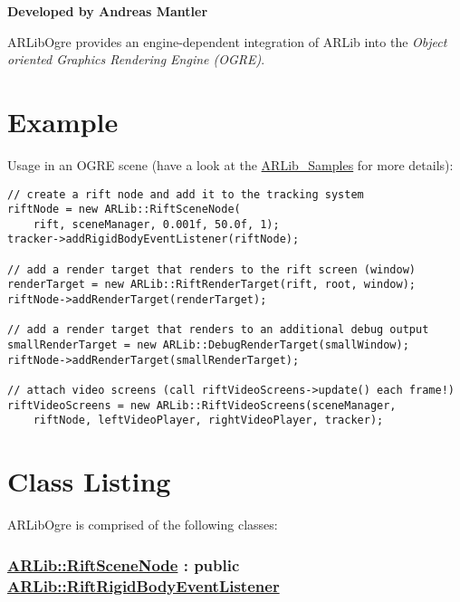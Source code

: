 \begin{center}
\textbf{Developed by Andreas Mantler}
\end{center}
ARLibOgre provides an engine-dependent integration of ARLib into the \emph{Object oriented Graphics Rendering Engine (OGRE)}\cite{ogre}.

\section{Example}\label{example}

Usage in an OGRE scene (have a look at the
\href{https://github.com/ands/OculusMeetsAR/tree/master/ARLib_Samples}{ARLib\_Samples}
for more details):

\begin{lstlisting}
// create a rift node and add it to the tracking system
riftNode = new ARLib::RiftSceneNode(
    rift, sceneManager, 0.001f, 50.0f, 1);
tracker->addRigidBodyEventListener(riftNode);

// add a render target that renders to the rift screen (window)
renderTarget = new ARLib::RiftRenderTarget(rift, root, window);
riftNode->addRenderTarget(renderTarget);

// add a render target that renders to an additional debug output
smallRenderTarget = new ARLib::DebugRenderTarget(smallWindow);
riftNode->addRenderTarget(smallRenderTarget);

// attach video screens (call riftVideoScreens->update() each frame!)
riftVideoScreens = new ARLib::RiftVideoScreens(sceneManager,
    riftNode, leftVideoPlayer, rightVideoPlayer, tracker);
\end{lstlisting}

\section{Class Listing}
ARLibOgre is comprised of the following classes:

\newpage
\subsubsection{\texorpdfstring{\href{https://github.com/ands/OculusMeetsAR/blob/master/ARLib/include/ARLib/Ogre/RiftSceneNode.h}{ARLib::RiftSceneNode}
: public
\href{https://github.com/ands/OculusMeetsAR/blob/master/ARLib/include/ARLib/Tracking/RigidBodyEventListener.h\#L33}{ARLib::RiftRigidBodyEventListener}}{ARLib::RiftSceneNode : public ARLib::RiftRigidBodyEventListener}}\label{arlibriftscenenode-public-arlibriftrigidbodyeventlistener}

